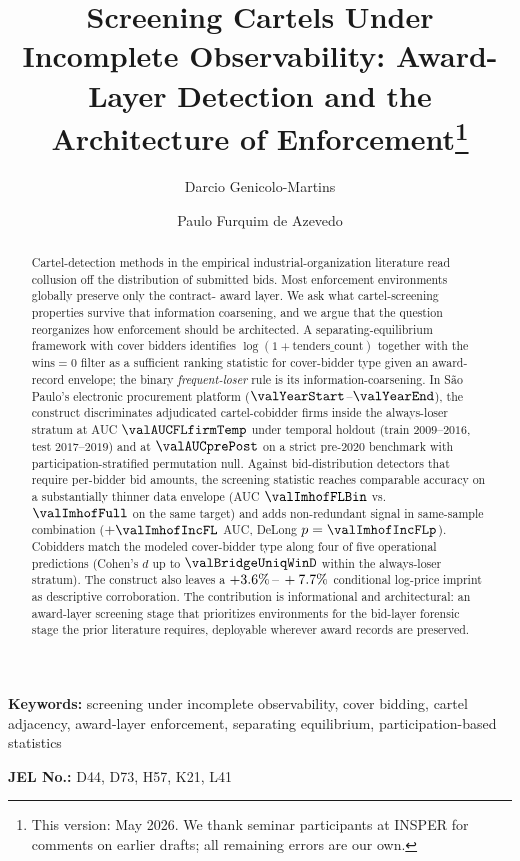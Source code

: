 \begin{frontmatter}

\title{Screening Cartels Under Incomplete Observability: Award-Layer Detection and the Architecture of Enforcement\texorpdfstring{\footnote{This version: May 2026. We thank seminar participants at INSPER for comments on earlier drafts; all remaining errors are our own.}}{}}

\author[insper]{Darcio Genicolo-Martins}
\author[insper]{Paulo Furquim de Azevedo}

\begin{abstract}
Cartel-detection methods in the empirical industrial-organization
literature read collusion off the distribution of submitted bids.
Most enforcement environments globally preserve only the contract-
award layer. We ask what cartel-screening properties survive that
information coarsening, and we argue that the question reorganizes
how enforcement should be architected. A separating-equilibrium
framework with cover bidders identifies
$\log(1+\text{tenders\_count})$ together with the
$\text{wins}=0$ filter as a sufficient ranking statistic for
cover-bidder type given an award-record envelope; the binary
\emph{frequent-loser} rule is its information-coarsening. In São
Paulo's electronic procurement platform
($\valYearStart$--$\valYearEnd$), the construct discriminates
adjudicated cartel-cobidder firms inside the always-loser stratum
at AUC $\valAUCFLfirmTemp$ under temporal holdout
(train $2009$--$2016$, test $2017$--$2019$) and at
$\valAUCprePost$ on a strict pre-$2020$ benchmark with
participation-stratified permutation null. Against bid-distribution
detectors that require per-bidder bid amounts, the screening
statistic reaches comparable accuracy on a substantially thinner
data envelope (AUC $\valImhofFLBin$ vs.\ $\valImhofFull$ on the same target) and
adds non-redundant signal in same-sample combination
($+\valImhofIncFL$ AUC, DeLong $p=\valImhofIncFLp$). Cobidders
match the modeled cover-bidder type along four of five
operational predictions (Cohen's $d$ up to $\valBridgeUniqWinD$ within the
always-loser stratum). The construct also leaves a
$+3.6\%\,\text{--}\,+7.7\%$ conditional log-price imprint as descriptive
corroboration. The contribution is informational and architectural:
an award-layer screening stage that prioritizes environments for
the bid-layer forensic stage the prior literature requires,
deployable wherever award records are preserved.
\end{abstract}

\end{frontmatter}

\noindent\textbf{Keywords:} screening under incomplete observability, cover bidding, cartel adjacency, award-layer enforcement, separating equilibrium, participation-based statistics

\noindent\textbf{JEL No.:} D44, D73, H57, K21, L41

\bigskip
